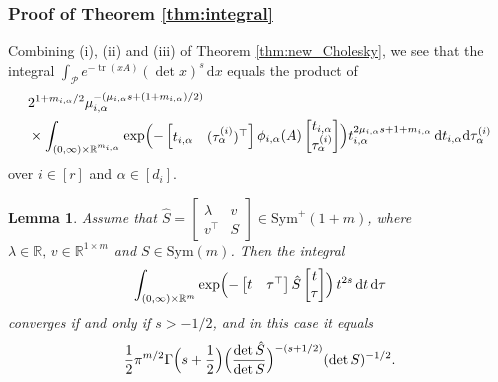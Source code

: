 \documentclass[12pt]{amsart}
\theoremstyle{plain}
\newtheorem{lemma}[theorem]{Lemma}
\theoremstyle{definition}
\theoremstyle{remark}
\newcommand{\R}{\mathbb{R}}
\newcommand{\1}{\mathbf{1}}
\newcommand{\dd}{\mathrm{d}}
\newcommand{\tr}{\operatorname{tr}}
\begin{document}
\subsubsection{Proof of Theorem \ref{thm:integral} }
Combining (i), (ii) and (iii) of Theorem \ref{thm:new_Cholesky},
 we see that
 the integral $\int_{\mathcal{P}} e^{-\tr(xA)} (\det x)^s\, \dd x$ 
equals the product of
\begin{equation} \label{eqn:integral_ialpha}
\begin{aligned}
{} & 2^{1 + m_{i,\alpha}/2} \mu_{i,\alpha}^{-(\mu_{i,\alpha} s + (1+m_{i,\alpha})/2)}\\
&\times
\int_{(0,\infty) \times \R^{m_{i,\alpha}} }
 \exp \Bigl( - \begin{bmatrix} t_{i,\alpha} & (\tau^{(i)}_\alpha)^\top \end{bmatrix}
\phi_{i,\alpha}(A)\begin{bmatrix} t_{i,\alpha} \\ \tau^{(i)}_\alpha \end{bmatrix}\Bigr)
 t_{i,\alpha}^{2 \mu_{i,\alpha} s + 1 + m_{i,\alpha}}\,\dd t_{i,\alpha} \dd\tau^{(i)}_\alpha
\end{aligned}
\end{equation}
over $i\in[r]$ and $\alpha\in[d_i]$.
%
% 
\begin{lemma} \label{lemma:exp_quad}
Assume that
 $\hat{S} = \begin{bmatrix} \lambda & v \\ v^\top & S \end{bmatrix} 
 \in \mathrm{Sym}^+(1+m)$, 
 where
$\lambda \in \R,\, v \in \R^{1 \times m}$ and $S \in \mathrm{Sym}(m)$.
Then the integral
\begin{equation} \label{eqn:Gauss-Gamma} 
\int_{(0,\infty) \times \R^m}
\exp \Bigl( - \begin{bmatrix} t & \tau^\top \end{bmatrix}
\hat{S}
\begin{bmatrix} t\\ \tau \end{bmatrix} \Bigr)
\,t^{2s} \,\dd t\, \dd\tau
\end{equation} 
 converges if and only if $s >-1/2$, and in this case it equals 
\[
\frac12 \pi^{m/2} \Gamma\Bigl(s + \frac12\Bigr) \Bigl( \frac{\det \hat{S} }{\det S} \Bigr)^{-(s + 1/2)}
 (\det S)^{-1/2}.
\]
\end{lemma}
\end{document}
